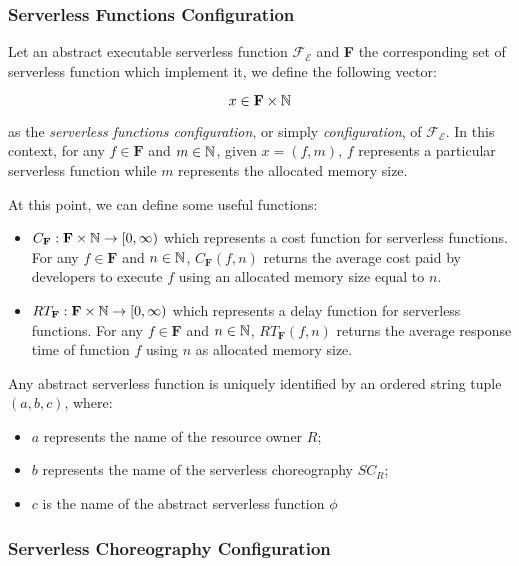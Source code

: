 \subsubsection{Serverless Functions Configuration}

Let an abstract executable serverless function $\mathscr{F_E}$ and \textbf{F} the corresponding set of serverless function which implement it, we define the following vector:

\begin{equation}
	x \in \textbf{F} \times \mathbb{N}
\end{equation}

as the \textit{serverless functions configuration}, or simply \textit{configuration}, of $\mathscr{F_E}$. In this context, for any $f \in \textbf{F}$ and $m \in \mathbb{N}$, given $x =(f,m)$, $f$ represents a particular serverless function while $m$ represents the allocated memory size.

At this point, we can define some useful functions:

\begin{itemize}	
	\item $C_{\textbf{F}} : \textbf{F} \times \mathbb{N} \to \left[ 0, \infty \right)$ which represents a cost function for serverless functions. For any $f \in \textbf{F}$ and $n \in \mathbb{N}$, $C_{\textbf{F}}(f,n)$ returns the average cost paid by developers to execute $f$ using an allocated memory size equal to $n$.
	
	\item $RT_{\textbf{F}} : \textbf{F} \times \mathbb{N} \to \left[ 0, \infty \right)$ which represents a delay function for serverless functions. For any $f \in \textbf{F}$ and $n \in \mathbb{N}$, $RT_{\textbf{F}}(f,n)$ returns the average response time of function $f$ using $n$ as allocated memory size.
\end{itemize}

Any abstract serverless function is uniquely identified by an ordered string tuple $(a, b, c)$, where:
\begin{itemize}
	\item $a$ represents the name of the resource owner $R$;
	\item $b$ represents the name of the serverless choreography $SC_R$;
	\item $c$ is the name of the abstract serverless function $\phi$
\end{itemize}

\subsubsection{Serverless Choreography Configuration}

